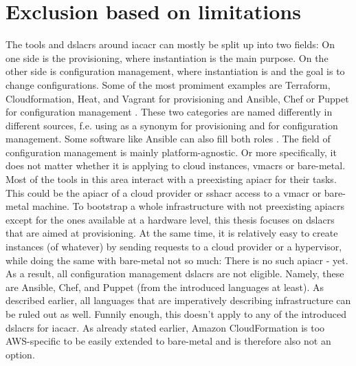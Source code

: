 \section{Exclusion based on limitations}
The tools and \gls{dslacr}s around \gls{iacacr} can mostly be split up into two fields: On one side is the provisioning, where instantiation is the main purpose. On the other side is configuration management, where instantiation is  and the goal is to change configurations. Some of the most promiment examples are Terraform, Cloudformation, Heat, and Vagrant for provisioning and Ansible, Chef or Puppet for configuration management \cite{iac_report} \cite{iac_oreilly} \cite{terraform_cloudformation} \cite{terraform_chef_puppet} \cite{atlassian_iac}.
\newline
These two categories are named differently in different sources, f.e. using  as a synonym for provisioning and  for configuration management. Some software like Ansible can also fill both roles \cite{iac_oreilly}.
\newline
The field of configuration management is mainly platform-agnostic. Or more specifically, it does not matter whether it is applying to cloud instances, \gls{vmacr}s or bare-metal. Most of the tools in this area interact with a preexisting \gls{apiacr} for their tasks. This could be the \gls{apiacr} of a cloud provider or \gls{sshacr} access to a \gls{vmacr} or bare-metal machine.
\newline
To bootstrap a whole infrastructure with not preexisting \gls{apiacr}s except for the ones available at a hardware level, this thesis focuses on \gls{dslacr}s that are aimed at provisioning. At the same time, it is relatively easy to create instances (of whatever) by sending requests to a cloud provider or a hypervisor, while doing the same with bare-metal not so much: There is no such \gls{apiacr} - yet.
\newline
As a result, all configuration management \gls{dslacr}s are not eligible. Namely, these are Ansible, Chef, and Puppet (from the introduced languages at least).
\newline
As described earlier, all languages that are imperatively describing infrastructure can be ruled out as well. Funnily enough, this doesn't apply to any of the introduced \gls{dslacr}s for \gls{iacacr}.
\newline
As already stated earlier, Amazon CloudFormation is too AWS-specific to be easily extended to bare-metal and is therefore also not an option.
